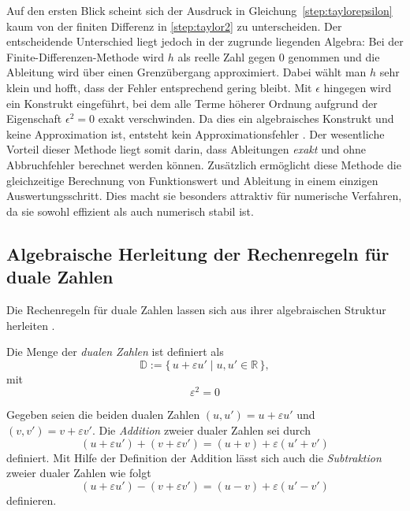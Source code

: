 Auf den ersten Blick scheint sich der Ausdruck in Gleichung~\eqref{step:taylorepsilon} kaum von der finiten Differenz in \eqref{step:taylor2} zu unterscheiden.
Der entscheidende Unterschied liegt jedoch in der zugrunde liegenden Algebra:  
Bei der Finite-Differenzen-Methode wird $h$ als reelle Zahl gegen $0$ genommen und die Ableitung wird über einen Grenzübergang approximiert.
Dabei wählt man $h$ sehr klein und hofft, dass der Fehler entsprechend gering bleibt. Mit $\epsilon$ hingegen wird ein Konstrukt eingeführt, bei dem alle Terme höherer Ordnung aufgrund der Eigenschaft $\epsilon^2 = 0$ exakt verschwinden.
Da dies ein algebraisches Konstrukt und keine Approximation ist, entsteht kein Approximationsfehler \cite{step:baydin2018}.
Der wesentliche Vorteil dieser Methode liegt somit darin, dass Ableitungen \emph{exakt} und ohne Abbruchfehler berechnet werden können.
Zusätzlich ermöglicht diese Methode die gleichzeitige Berechnung von Funktionswert und Ableitung in einem einzigen Auswertungsschritt.
Dies macht sie besonders attraktiv für numerische Verfahren, da sie sowohl effizient als auch numerisch stabil ist.



\subsection{Algebraische Herleitung der Rechenregeln für duale Zahlen}

Die Rechenregeln für duale Zahlen lassen sich aus ihrer algebraischen Struktur herleiten \cite{step:baydin2018}. 
\begin{definition}
	\normalfont
	Die Menge der \emph{dualen Zahlen} ist definiert als
%
%
	\begin{equation}
		\mathbb{D} := \{\, u + \varepsilon u' \mid u,u' \in \mathbb{R} \,\},
	\end{equation}
	mit
	\begin{equation}
		\varepsilon^2 = 0
	\end{equation}
\end{definition}

Gegeben seien die beiden dualen Zahlen $(u,u') = u + \varepsilon u'$ und $(v,v') = v + \varepsilon v'$.
Die \emph{Addition} zweier dualer Zahlen sei durch
\begin{equation*}
(u + \varepsilon u') + (v + \varepsilon v') 
	= (u+v) + \varepsilon(u'+v')
\end{equation*}
definiert.
Mit Hilfe der Definition der Addition lässt sich auch die \emph{Subtraktion} zweier dualer Zahlen wie folgt
\begin{equation*}
	(u + \varepsilon u') - (v + \varepsilon v') 
	= (u-v) + \varepsilon(u'-v')
\end{equation*}
definieren.

